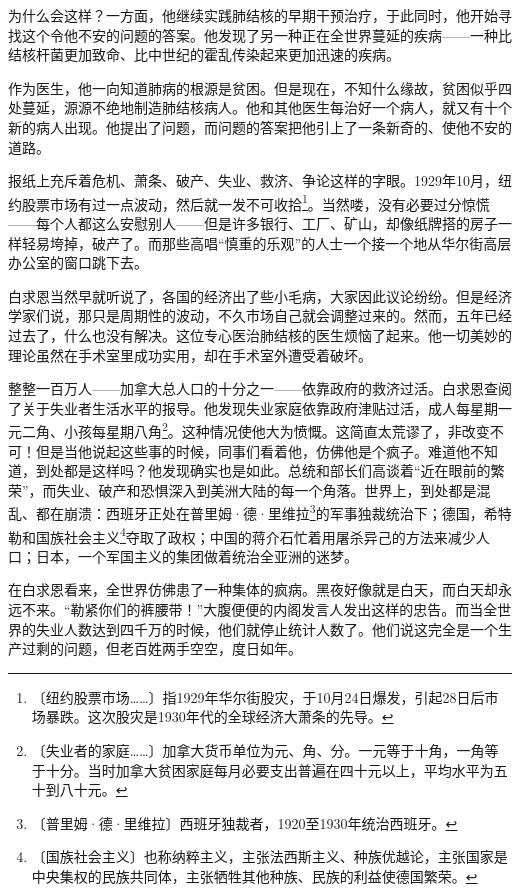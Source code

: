 \documentclass[12pt,UTF-8,openany]{ctexbook}
\begin{document}
\begin{normalsize}
    为什么会这样？一方面，他继续实践肺结核的早期干预治疗，于此同时，他开始寻找这个令他不安的问题的答案。他发现了另一种正在全世界蔓延的疾病——一种比结核杆菌更加致命、比中世纪的霍乱传染起来更加迅速的疾病。
    
    作为医生，他一向知道肺病的根源是贫困。但是现在，不知什么缘故，贫困似乎四处蔓延，源源不绝地制造肺结核病人。他和其他医生每治好一个病人，就又有十个新的病人出现。他提出了问题，而问题的答案把他引上了一条新奇的、使他不安的道路。
    
    报纸上充斥着危机、萧条、破产、失业、救济、争论这样的字眼。1929年10月，纽约股票市场有过一点波动，然后就一发不可收拾\footnote{〔纽约股票市场……〕指1929年华尔街股灾，于10月24日爆发，引起28日后市场暴跌。这次股灾是1930年代的全球经济大萧条的先导。}。当然喽，没有必要过分惊慌——每个人都这么安慰别人——但是许多银行、工厂、矿山，却像纸牌搭的房子一样轻易垮掉，破产了。而那些高唱“慎重的乐观”的人士一个接一个地从华尔街高层办公室的窗口跳下去。
    
    白求恩当然早就听说了，各国的经济出了些小毛病，大家因此议论纷纷。但是经济学家们说，那只是周期性的波动，不久市场自己就会调整过来的。然而，五年已经过去了，什么也没有解决。这位专心医治肺结核的医生烦恼了起来。他一切美妙的理论虽然在手术室里成功实用，却在手术室外遭受着破坏。
    
    整整一百万人——加拿大总人口的十分之一——依靠政府的救济过活。白求恩查阅了关于失业者生活水平的报导。他发现失业家庭依靠政府津贴过活，成人每星期一元二角、小孩每星期八角\footnote{〔失业者的家庭……〕加拿大货币单位为元、角、分。一元等于十角，一角等于十分。当时加拿大贫困家庭每月必要支出普遍在四十元以上，平均水平为五十到八十元。}。这种情况使他大为愤慨。这简直太荒谬了，非改变不可！但是当他说起这些事的时候，同事们看着他，仿佛他是个疯子。难道他不知道，到处都是这样吗？他发现确实也是如此。总统和部长们高谈着“近在眼前的繁荣”，而失业、破产和恐惧深入到美洲大陆的每一个角落。世界上，到处都是混乱、都在崩溃：西班牙正处在普里姆·德·里维拉\footnote{〔普里姆·德·里维拉〕西班牙独裁者，1920至1930年统治西班牙。}的军事独裁统治下；德国，希特勒和国族社会主义\footnote{〔国族社会主义〕也称纳粹主义，主张法西斯主义、种族优越论，主张国家是中央集权的民族共同体，主张牺牲其他种族、民族的利益使德国繁荣。}夺取了政权；中国的蒋介石忙着用屠杀异己的方法来减少人口；日本，一个军国主义的集团做着统治全亚洲的迷梦。
    
    在白求恩看来，全世界仿佛患了一种集体的疯病。黑夜好像就是白天，而白天却永远不来。“勒紧你们的裤腰带！”大腹便便的内阁发言人发出这样的忠告。而当全世界的失业人数达到四千万的时候，他们就停止统计人数了。他们说这完全是一个生产过剩的问题，但老百姓两手空空，度日如年。
    

\end{normalsize}
\end{document}
